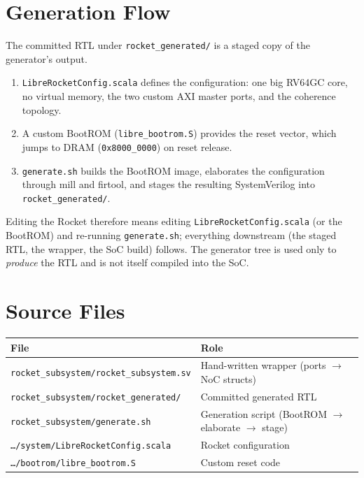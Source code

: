 \section{Generation Flow}
The committed RTL under \texttt{rocket\_generated/} is a staged copy of the generator's output.

\begin{enumerate}[nosep]
  \item \texttt{LibreRocketConfig.scala} defines the configuration: one big RV64GC core, no virtual
        memory, the two custom AXI master ports, and the coherence topology.
  \item A custom BootROM (\texttt{libre\_bootrom.S}) provides the reset vector, which jumps to DRAM
        (\texttt{0x8000\_0000}) on reset release.
  \item \texttt{generate.sh} builds the BootROM image, elaborates the configuration through mill and
        firtool, and stages the resulting SystemVerilog into \texttt{rocket\_generated/}.
\end{enumerate}

\begin{docnote}
Editing the Rocket therefore means editing \texttt{LibreRocketConfig.scala} (or the BootROM) and
re-running \texttt{generate.sh}; everything downstream (the staged RTL, the wrapper, the SoC build)
follows. The generator tree is used only to \emph{produce} the RTL and is not itself compiled into the
SoC.
\end{docnote}

\section{Source Files}

\begin{tabular}{@{}ll@{}}
\toprule
\textbf{File} & \textbf{Role} \\
\midrule
\texttt{rocket\_subsystem/rocket\_subsystem.sv} & Hand-written wrapper (ports $\to$ NoC structs) \\
\texttt{rocket\_subsystem/rocket\_generated/} & Committed generated RTL \\
\texttt{rocket\_subsystem/generate.sh} & Generation script (BootROM $\to$ elaborate $\to$ stage) \\
\texttt{\ldots/system/LibreRocketConfig.scala} & Rocket configuration \\
\texttt{\ldots/bootrom/libre\_bootrom.S} & Custom reset code \\
\bottomrule
\end{tabular}

\newpage
